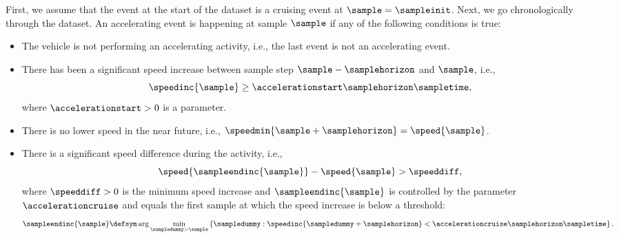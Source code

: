 First, we assume that the event at the start of the dataset is a cruising event at $\sample=\sampleinit$. Next, we go chronologically through the dataset. An accelerating event is happening at sample $\sample$ if any of the following conditions is true:
\begin{itemize}
	\item The vehicle is not performing an accelerating activity, i.e., the last event is not an accelerating event.
	\item \cstarta There has been a significant speed increase between sample step $\sample-\samplehorizon$ and $\sample$, i.e., 
	\begin{equation}
		\label{eq:start acceleration}
		\speedinc{\sample} \geq \accelerationstart\samplehorizon\sampletime,
	\end{equation} \cenda
	where $\accelerationstart>0$ is a parameter.
	\item There is no lower speed in the near future, i.e., $\speedmin{\sample+\samplehorizon}=\speed{\sample}$.
	\item There is a significant speed difference during the activity, i.e., 
	\begin{equation}
		\speed{\sampleendinc{\sample}} - \speed{\sample} > \speeddiff,
	\end{equation}
	where \cstartc $\speeddiff>0$ is the minimum speed increase and \cendc $\sampleendinc{\sample}$ is controlled by the parameter $\accelerationcruise$ and \cstarta equals the first sample at which the speed increase is below a threshold\cenda:
	\begin{equation}
		\label{eq:end acceleration}
		\sampleendinc{\sample} \defsym \arg \min_{\sampledummy > \sample} \left\{ \sampledummy: \speedinc{\sampledummy+\samplehorizon} < \accelerationcruise\samplehorizon\sampletime \right\}.
	\end{equation}
\end{itemize}

